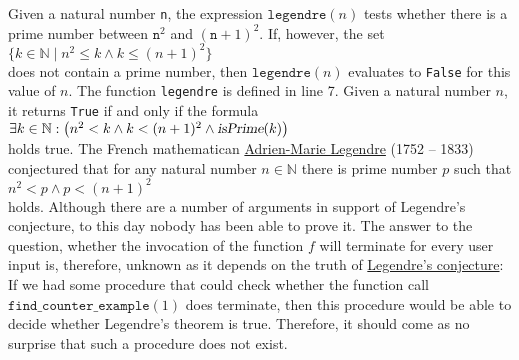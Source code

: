 Given a natural number \texttt{n}, the expression
$\texttt{legendre}(n)$ tests whether there is a prime number between $\texttt{n}^2$ and $(\texttt{n}+1)^2$.  
If, however, the set
\\[0.2cm]
\hspace*{1.3cm}
$\{ k \in \mathbb{N} \mid n^2 \leq k \wedge k \leq (n+1)^2 \}$
\\[0.2cm]
does not contain a prime number, then $\texttt{legendre}(n)$ evaluates
to \texttt{False} for this value of $n$.  The function \texttt{legendre} is defined in line 7.  
Given a natural number $n$, it returns \texttt{True} if and only if the formula
\\[0.2cm]
\hspace*{1.3cm}
$\exists k \in \mathbb{N}:\bigl( n^2 < k \wedge k < (n+1)^2 \wedge \textsl{isPrime}(k)\bigr)$
\\[0.2cm]
holds true.  The French mathematican 
\href{http://en.wikipedia.org/wiki/Adrien-Marie_Legendre}{Adrien-Marie Legendre} (1752 -- 1833) conjectured that
for any natural number $n \in \mathbb{N}$ there is prime number $p$ such that
\\[0.2cm]
\hspace*{1.3cm}
$n^2 < p \wedge  p < (n+1)^2$
\\[0.2cm]
holds.  Although there are a number of arguments in support of Legendre's conjecture,  to this day
nobody has been able to prove it.  The answer to the question, whether the invocation of the function $f$ will
terminate for every user input is, therefore, unknown as it depends on the truth of 
\href{http://en.wikipedia.org/wiki/Legendre's_conjecture}{Legendre's conjecture}:  If we
had some procedure that could check whether the function call $\texttt{find\_counter\_example}(1)$ does terminate,
then this procedure would be able to decide whether Legendre's theorem is true.  Therefore, it
should come as no surprise that such a procedure does not exist.


